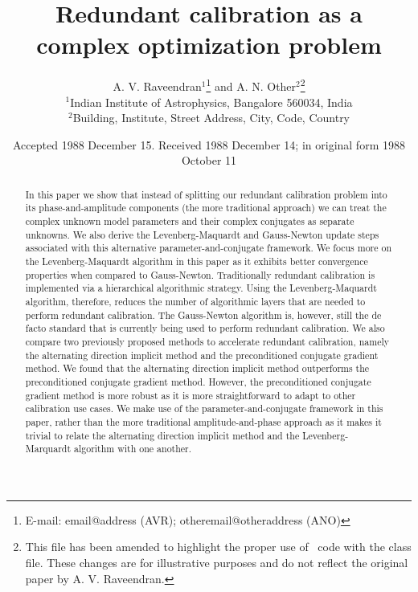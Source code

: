 \documentclass[useAMS,usenatbib]{mn2e}
\title[Unknown]{Redundant calibration as a complex optimization problem}
\author[A. V. Raveendran and A. N. Other]{A. V. Raveendran$^{1}$\thanks{E-mail:
email@address (AVR); otheremail@otheraddress (ANO)} and A. N.
Other$^{2}$\footnotemark[1]\thanks{This file has been amended to
highlight the proper use of \LaTeXe\ code with the class file.
These changes are for illustrative purposes and do not reflect the
original paper by A. V. Raveendran.}\\
$^{1}$Indian Institute of Astrophysics, Bangalore 560034, India\\
$^{2}$Building, Institute, Street Address, City, Code, Country}
\begin{document}
\date{Accepted 1988 December 15. Received 1988 December 14; in original form 1988 October 11}

\pagerange{\pageref{firstpage}--\pageref{lastpage}} 

\maketitle

\label{firstpage}

\begin{abstract}
In this paper we show that instead of splitting our redundant calibration problem into its phase-and-amplitude components (the more traditional approach) we can treat the complex unknown model parameters and their complex conjugates as separate unknowns. 
We also derive the Levenberg-Maquardt and Gauss-Newton update steps associated with this alternative parameter-and-conjugate framework.
We focus more on the Levenberg-Maquardt algorithm in this paper as it exhibits better convergence properties when compared to Gauss-Newton.
Traditionally redundant calibration is implemented via a hierarchical algorithmic strategy. Using the Levenberg-Maquardt algorithm, therefore, reduces the number of algorithmic layers that are needed to perform redundant calibration.
The Gauss-Newton algorithm is, however, still the de facto standard that is currently being used to perform redundant calibration.
We also compare two previously proposed methods to accelerate redundant calibration, namely the alternating direction implicit method and the preconditioned conjugate gradient method. We found that the alternating 
direction implicit method outperforms the preconditioned conjugate gradient method. However, the preconditioned conjugate gradient method is more robust as it is more straightforward to adapt to other calibration use cases. 
We make use of the parameter-and-conjugate framework in this paper, rather than the more traditional amplitude-and-phase approach as it makes it trivial to relate the alternating direction implicit method 
and the Levenberg-Marquardt algorithm with one another.
\end{abstract}

\end{document}
